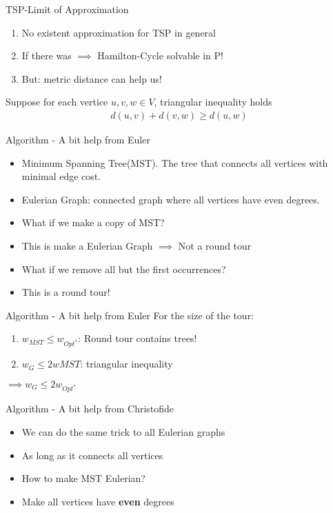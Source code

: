 \documentclass{beamer}
\begin{document}
\begin{frame}{TSP-Limit of Approximation}
    \begin{enumerate}
        \item<1-3> No existent approximation for TSP in general 
        \item<2-3> If there was $\implies$ Hamilton-Cycle solvable in P!
        \item<3> But: metric distance can help us!
    \end{enumerate}
    \pause 
    Suppose for each vertice $u, v, w \in V$, triangular inequality holds
    \begin{align*}
        d(u, v) + d(v, w) \geq d(u, w)
    \end{align*}
\end{frame}

\begin{frame}{Algorithm - A bit help from Euler}
    \begin{itemize}
        \item<1-2> Minimum Spanning Tree(MST). The tree that connects all vertices with minimal edge cost.
        \item<2> Eulerian Graph: connected graph where all vertices have even degrees.
        \item<3-> What if we make a copy of MST?
        \item<4-> This is make a Eulerian Graph $\implies$ Not a round tour 
        \item<5-> What if we remove all but the first occurrences?
        \item<6-> This is a round tour!
    \end{itemize}
\end{frame}

\begin{frame}{Algorithm - A bit help from Euler}
    For the size of the tour:
    \begin{enumerate}
        \item $w_{MST} \leq w_{Opt^*}$: Round tour contains trees!
        \item $w_G \leq 2w{MST}$: triangular inequality
    \end{enumerate}
    $\implies w_G \leq 2w_{Opt^*}$ 
\end{frame}

\begin{frame}{Algorithm - A bit help from Christofide}
\begin{itemize}
    \item<1-> We can do the same trick to all Eulerian graphs
    \item<2-> As long as it connects all vertices 
    \item<3-> How to make MST Eulerian?
    \item<4-> Make all vertices have \textbf{even} degrees
\end{itemize}
\end{frame}
\end{document}

